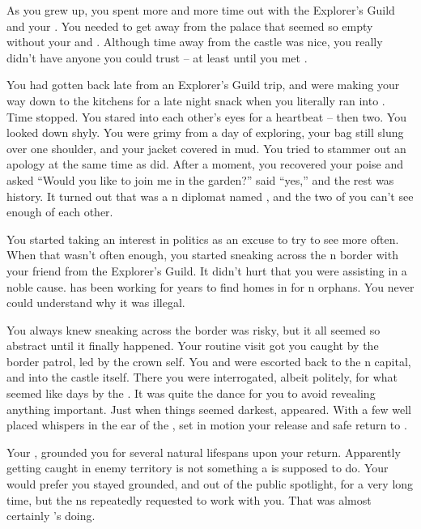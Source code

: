 \documentclass[char]{NeptuneBall}
\begin{document}
As you grew up, you spent more and more time out with the Explorer's Guild and your \cPlant{\uncle}. You needed to get away from the palace that seemed so empty without your \cQueen{\parent} and \cAriel{\sibling}. Although time away from the castle was nice, you really didn't have anyone you could trust -- at least until you met \emph{\cDiplomat{\them}}.

You had gotten back late from an Explorer's Guild trip, and were making your way down to the kitchens for a late night snack when you literally ran into \emph{\cDiplomat{\them}}. Time stopped. You stared into each other's eyes for a heartbeat -- then two. You looked down shyly. You were grimy from a day of exploring, your bag still slung over one shoulder, and your jacket covered in mud. You tried to stammer out an apology at the same time as \cDiplomat{\they} did. After a moment, you recovered your poise and asked ``Would you like to join me in the garden?'' \cDiplomat{\They} said ``yes,'' and the rest was history.  It turned out that \cDiplomat{\they} was a \pPacifica{}n diplomat named \cDiplomat{}, and the two of you can't see enough of each other. 

You started taking an interest in politics as an excuse to try to see \cDiplomat{\them} more often. When that wasn't often enough, you started sneaking across the \pPacifica{}n border with your friend \cPriest{} from the Explorer's Guild. It didn't hurt that you were assisting in a noble cause. \cPriest{} has been working for years to find homes in \pPacifica{} for \pAtlantis{}n orphans. You never could understand why it was illegal.

You always knew sneaking across the border was risky, but it all seemed so abstract until it finally happened. Your routine visit got you caught by the border patrol, led by the crown \cPrince{\Prince} \cPrince{\them}self. You and \cPriest{} were escorted back to the \pPacifica{}n capital, and into the castle itself. There you were interrogated, albeit politely, for what seemed like days by the \cPrince{\prince}. It was quite the dance for you to avoid revealing anything important. Just when things seemed darkest, \cDiplomat{} appeared. With a few well placed whispers in the ear of the \cPrince{\Prince}, \cDiplomat{\they} set in motion your release and safe return to \pAtlantis{}.

Your \cKing{\parent}, \cKing{\King} \cKing{} grounded you for several natural lifespans upon your return. Apparently getting caught in enemy territory is not something a \cPrincess{\prince} is supposed to do. Your \cKing{\parent} would prefer you stayed grounded, and out of the public spotlight, for a very long time, but the \pPacifica{}ns repeatedly requested to work with you. That was almost certainly \cDiplomat{}'s doing. 
\end{document}
